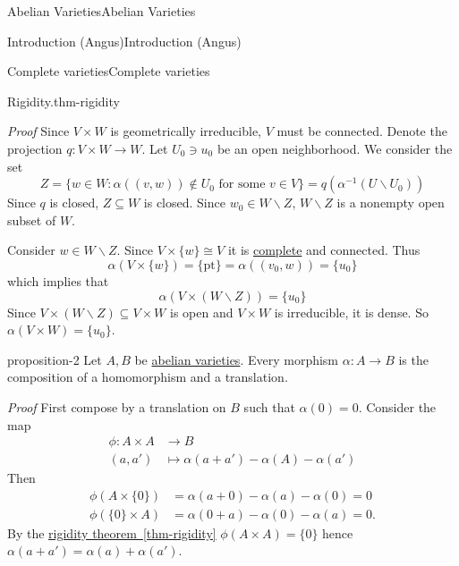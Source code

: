 \documentclass[10pt,]{book}
\makeatletter
\renewcommand*{\proofname}{Proof}
\renewenvironment{proof}[1][\proofname]{\par
  \pushQED{\qed}%
  \normalfont \topsep6\p@\@plus6\p@\relax
  \trivlist
  \item\relax
    {\itshape
    #1\@addpunct{.}}\hspace\labelsep\ignorespaces
}{%
  \popQED\endtrivlist\@endpefalse
}
\numberwithin{equation}{section}
\newcommand{\amp}{&}
\makeatother
\begin{document}
\begin{chapterptx}{Abelian Varieties}{}{Abelian Varieties}{}{}
\begin{sectionptx}{Introduction (Angus)}{}{Introduction (Angus)}{}{}
\begin{subsectionptx}{Complete varieties}{}{Complete varieties}{}{}
\begin{theorem}{Rigidity.}{}{thm-rigidity}
\end{theorem}
\begin{proof}\hypertarget{proof-5}{}
\hypertarget{p-31}{}%
Since \(V\times W\) is geometrically irreducible, \(V\) must be connected. Denote the projection \(q\colon V\times W \to W\). Let \(U_0 \ni u_0\) be an open neighborhood. We consider the set%
\begin{equation*}
Z = \{w\in W : \alpha((v,w)) \not\in U_0 \text{ for some } v\in V\} = q(\alpha^{-1}(U\smallsetminus U_0))
\end{equation*}
Since \(q\) is closed, \(Z\subseteq W\) is closed. Since \(w_0\in W\smallsetminus Z\), \(W\smallsetminus Z\) is a nonempty open subset of \(W\).%
\par
\hypertarget{p-32}{}%
Consider \(w \in W\smallsetminus Z\). Since \(V\times\{w\} \cong V\) it is \hyperref[def-abelian-complete-var]{complete} and connected. Thus%
\begin{equation*}
\alpha(V\times \{w\}) = \{\text{pt}\} = \alpha((v_0,w)) = \{u_0\}
\end{equation*}
which implies that%
\begin{equation*}
\alpha(V\times (W\smallsetminus Z)) = \{u_0\}
\end{equation*}
Since \(V\times (W\smallsetminus Z) \subseteq V\times W\) is open and \(V\times W\) is irreducible, it is dense. So \(\alpha(V\times W) = \{u_0\}\).%
\end{proof}
\begin{proposition}{}{}{proposition-2}%
\hypertarget{p-33}{}%
Let \(A,B\) be \hyperref[def-buntes-abvar]{abelian varieties}. Every morphism \(\alpha \colon A \to B \) is the composition of a homomorphism and a translation.%
\end{proposition}
\begin{proof}\hypertarget{proof-6}{}
\hypertarget{p-34}{}%
First compose by a translation on \(B\) such that \(\alpha(0) = 0\). Consider the map%
\begin{align*}
\phi \colon A\times A\amp\to B\\
(a,a')               \amp\mapsto \alpha(a+a') - \alpha(A) -\alpha(a')
\end{align*}
Then%
\begin{align*}
\phi(A\times\{0\}) \amp = \alpha(a+ 0) - \alpha(a) - \alpha(0) = 0\\
\phi(\{0\}\times A) \amp = \alpha(0+ a) - \alpha(0) - \alpha(a) = 0\text{.}
\end{align*}
By the \hyperref[thm-rigidity]{rigidity theorem~\ref{thm-rigidity}} \(\phi(A\times A) = \{0\}\) hence \(\alpha(a + a') = \alpha(a) + \alpha(a')\).%

\end{proof}
\end{subsectionptx}
\end{sectionptx}
\end{chapterptx}
\end{document}
